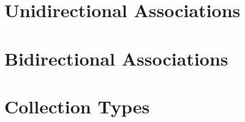 
\section{Unidirectional Associations}\label{sec:assoc-unidir}

\section{Bidirectional Associations}\label{sec:assoc-bidir}

\section{Collection Types}\label{sec:collection-types}
